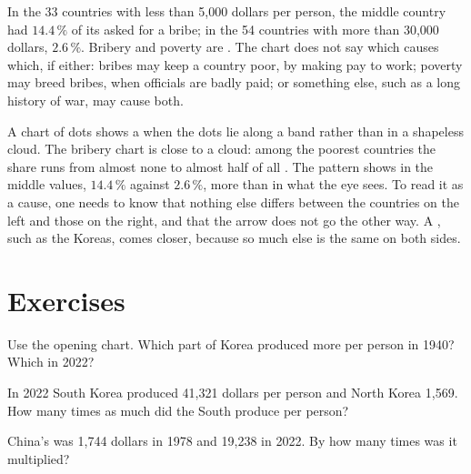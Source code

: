 In the 33 countries with less than 5,000 dollars per person, the middle country had $14.4\,\%$ of its 
asked for a bribe; in the 54 countries with more than 30,000 dollars, $2.6\,\%$. Bribery and poverty are
. The chart does not say which causes which, if either: bribes may keep a country poor, by
making  pay to work; poverty may breed bribes, when officials are badly paid; or something else, such
as a long history of war, may cause both.

\begin{measure}
A chart of dots shows a  when the dots lie along a band rather than in a shapeless cloud. The
bribery chart is close to a cloud: among the poorest countries the share runs from almost none to almost
half of all . The pattern shows in the middle values, $14.4\,\%$ against $2.6\,\%$, more than in
what the eye sees. To
read it as a cause, one needs to know that nothing else differs between the countries on the left and
those on the right, and that the arrow does not go the other way. A , such as the
Koreas, comes closer, because so much else is the same on both sides.
\end{measure}

\section{Exercises}

\begin{exercise}[$\star$]\label{exo:g9:institutions-and-prosperity:1}
Use the opening chart. Which part of Korea produced more per person in 1940? Which in 2022?
\end{exercise}

\begin{exercise}[$\star$]\label{exo:g9:institutions-and-prosperity:2}
In 2022 South Korea produced 41,321 dollars per person and North Korea 1,569. How many times as much did the
South produce per person?
\end{exercise}

\begin{exercise}[$\star$]\label{exo:g9:institutions-and-prosperity:3}
China's  was 1,744 dollars in 1978 and 19,238 in 2022. By how many times was it multiplied?
\end{exercise}

